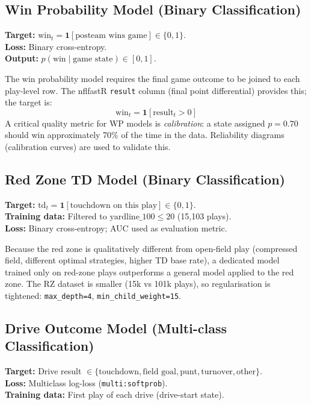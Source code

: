 \documentclass[11pt]{article}
\begin{document}
\subsection{Win Probability Model (Binary Classification)}

\textbf{Target:} $\text{win}_t = \mathbf{1}[\text{posteam wins game}] \in \{0,1\}$.\\
\textbf{Loss:} Binary cross-entropy.\\
\textbf{Output:} $p(\text{win} \mid \text{game state}) \in [0,1]$.

The win probability model requires the final game outcome to be joined to
each play-level row. The nflfastR \texttt{result} column (final point
differential) provides this; the target is:
\begin{equation}
  \text{win}_t = \mathbf{1}[\text{result}_t > 0]
\end{equation}
A critical quality metric for WP models is \emph{calibration}: a state
assigned $p = 0.70$ should win approximately 70\% of the time in the
data. Reliability diagrams (calibration curves) are used to validate this.

\subsection{Red Zone TD Model (Binary Classification)}

\textbf{Target:} $\text{td}_t = \mathbf{1}[\text{touchdown on this play}] \in \{0,1\}$.\\
\textbf{Training data:} Filtered to $\text{yardline\_100} \leq 20$ (15,103 plays).\\
\textbf{Loss:} Binary cross-entropy; AUC used as evaluation metric.

Because the red zone is qualitatively different from open-field play
(compressed field, different optimal strategies, higher TD base rate),
a dedicated model trained only on red-zone plays outperforms a general model
applied to the red zone. The RZ dataset is smaller (15k vs 101k plays),
so regularisation is tightened: \texttt{max\_depth=4}, \texttt{min\_child\_weight=15}.

\subsection{Drive Outcome Model (Multi-class Classification)}

\textbf{Target:} Drive result $\in \{\text{touchdown}, \text{field goal}, \text{punt}, \text{turnover}, \text{other}\}$.\\
\textbf{Loss:} Multiclass log-loss (\texttt{multi:softprob}).\\
\textbf{Training data:} First play of each drive (drive-start state).
\end{document}
